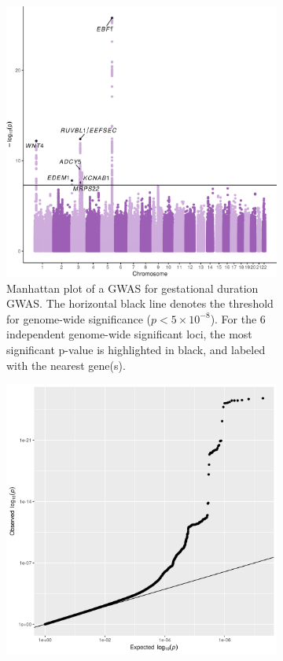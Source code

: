 \begin{figure}
  \centering
    \begin{subfigure}[t]{\textwidth}
    \centering
    \includegraphics[width=\linewidth]{img/FigureS_Manhattan_plot.png}
    \caption{Manhattan plot of a GWAS for gestational duration GWAS. The horizontal black line denotes the threshold for genome-wide significance ($p < 5 \times 10^{-8}$). For the 6 independent genome-wide significant loci, the most significant p-value is highlighted in black, and labeled with the nearest gene(s).}\label{fig:manhattan}
  \end{subfigure}
  \begin{subfigure}[t]{\textwidth}
    \centering
    \includegraphics[width=\linewidth]{img/FigureS_qq_plot.png}

\end{subfigure}
\end{figure}
